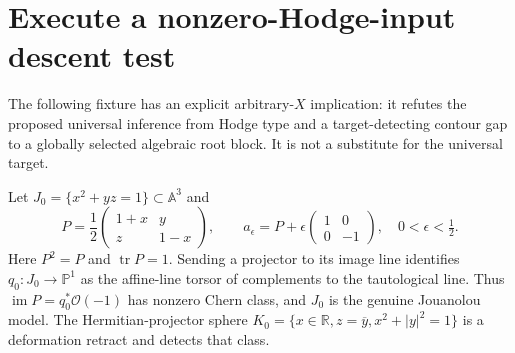 \documentclass[11pt]{article}
\begin{document}
\section{Execute a nonzero-Hodge-input descent test}
The following fixture has an explicit arbitrary-$X$ implication: it refutes
the proposed universal inference from Hodge type and a target-detecting
contour gap to a globally selected algebraic root block. It is not a
substitute for the universal target.

Let $J_0=\{x^2+yz=1\}\subset\mathbb A^3$ and
\[
 P=\frac12\begin{pmatrix}1+x&y\\z&1-x\end{pmatrix},\qquad
 a_\epsilon=P+\epsilon\begin{pmatrix}1&0\\0&-1\end{pmatrix},
 \quad0<\epsilon<\tfrac12.                            \tag{14}
\]
Here $P^2=P$ and $\operatorname{tr}P=1$. Sending a projector to its image
line identifies $q_0:J_0\to\mathbb P^1$ as the affine-line torsor of
complements to the tautological line. Thus $\operatorname{im}P=q_0^*\mathcal
O(-1)$ has nonzero Chern class, and $J_0$ is the genuine Jouanolou model.
The Hermitian-projector sphere
$K_0=\{x\in\mathbb R,z=\overline y,x^2+|y|^2=1\}$ is a deformation
retract and detects that class.
\end{document}
